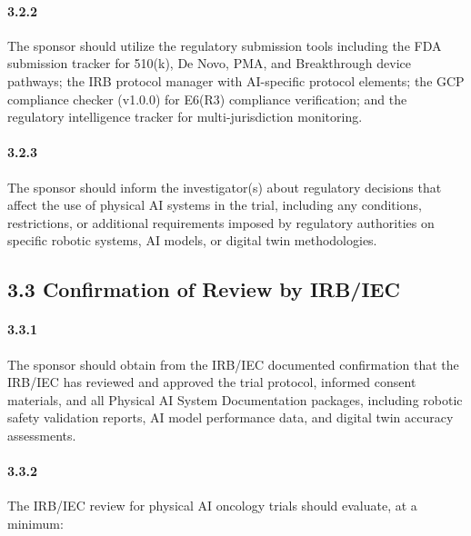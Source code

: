 \documentclass[11pt]{article}
\begin{document}
\paragraph{3.2.2} The sponsor should utilize the regulatory submission tools including the FDA submission tracker for 510(k), De Novo, PMA, and Breakthrough device pathways; the IRB protocol manager with AI-specific protocol elements; the GCP compliance checker (v1.0.0) for E6(R3) compliance verification; and the regulatory intelligence tracker for multi-jurisdiction monitoring.

\paragraph{3.2.3} The sponsor should inform the investigator(s) about regulatory decisions that affect the use of physical AI systems in the trial, including any conditions, restrictions, or additional requirements imposed by regulatory authorities on specific robotic systems, AI models, or digital twin methodologies.

\subsection{3.3 Confirmation of Review by IRB/IEC}

\paragraph{3.3.1} The sponsor should obtain from the IRB/IEC documented confirmation that the IRB/IEC has reviewed and approved the trial protocol, informed consent materials, and all Physical AI System Documentation packages, including robotic safety validation reports, AI model performance data, and digital twin accuracy assessments.

\paragraph{3.3.2} The IRB/IEC review for physical AI oncology trials should evaluate, at a minimum:
\end{document}
